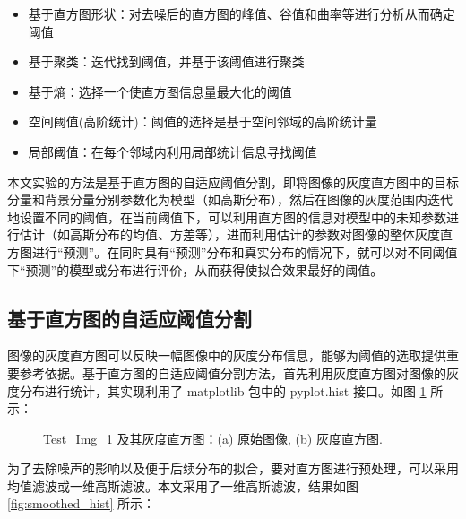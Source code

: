 \begin{itemize}
	\item 基于直方图形状：对去噪后的直方图的峰值、谷值和曲率等进行分析从而确定阈值
	\item 基于聚类：迭代找到阈值，并基于该阈值进行聚类
	\item 基于熵：选择一个使直方图信息量最大化的阈值
	\item 空间阈值(高阶统计)：阈值的选择是基于空间邻域的高阶统计量
	\item 局部阈值：在每个邻域内利用局部统计信息寻找阈值
\end{itemize}

本文实验的方法是基于直方图的自适应阈值分割，即将图像的灰度直方图中的目标分量和背景分量分别参数化为模型（如高斯分布），然后在图像的灰度范围内迭代地设置不同的阈值，在当前阈值下，可以利用直方图的信息对模型中的未知参数进行估计（如高斯分布的均值、方差等），进而利用估计的参数对图像的整体灰度直方图进行“预测”。在同时具有“预测”分布和真实分布的情况下，就可以对不同阈值下“预测”的模型或分布进行评价，从而获得使拟合效果最好的阈值。

\subsection{基于直方图的自适应阈值分割}

图像的灰度直方图可以反映一幅图像中的灰度分布信息，能够为阈值的选取提供重要参考依据。基于直方图的自适应阈值分割方法，首先利用灰度直方图对图像的灰度分布进行统计，其实现利用了 matplotlib 包中的 pyplot.hist 接口。如图 \ref{fig:gray_level_histogram} 所示：

\begin{figure}[!ht]
\vspace{-0.9cm}
  \centering
  \begin{minipage}[b]{\linewidth} 
  \hfill
  \end{minipage}
  \vfill
  \caption{Test\_Img\_1 及其灰度直方图：(a) 原始图像, (b) 灰度直方图.}
  \label{fig:gray_level_histogram}
\end{figure}

为了去除噪声的影响以及便于后续分布的拟合，要对直方图进行预处理，可以采用均值滤波或一维高斯滤波。本文采用了一维高斯滤波，结果如图 \ref{fig:smoothed_hist} 所示：

